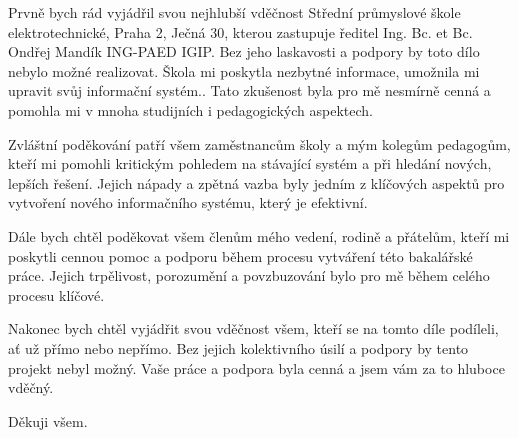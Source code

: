 \begin{acknowledgement}
    Prvně bych rád vyjádřil svou nejhlubší vděčnost Střední průmyslové škole elektrotechnické, Praha 2, Ječná 30, kterou zastupuje ředitel Ing. Bc. et Bc. Ondřej Mandík ING-PAED IGIP. Bez jeho laskavosti a podpory by toto dílo nebylo možné realizovat. Škola mi poskytla nezbytné informace, umožnila mi upravit svůj informační systém.. Tato zkušenost byla pro mě nesmírně cenná a pomohla mi v mnoha studijních i pedagogických aspektech.
    
    Zvláštní poděkování patří všem zaměstnancům školy a mým kolegům pedagogům, kteří mi pomohli kritickým pohledem na stávající systém a při hledání nových, lepších řešení. Jejich nápady a zpětná vazba byly jedním z klíčových aspektů pro vytvoření nového informačního systému, který je efektivní.
    
    Dále bych chtěl poděkovat všem členům mého vedení, rodině a přátelům, kteří mi poskytli cennou pomoc a podporu během procesu vytváření této bakalářské práce. Jejich trpělivost, porozumění a povzbuzování bylo pro mě během celého procesu klíčové.
    
    Nakonec bych chtěl vyjádřit svou vděčnost všem, kteří se na tomto díle podíleli, ať už přímo nebo nepřímo. Bez jejich kolektivního úsilí a podpory by tento projekt nebyl možný. Vaše práce a podpora byla cenná a jsem vám za to hluboce vděčný.
    
    Děkuji všem.
\end{acknowledgement}